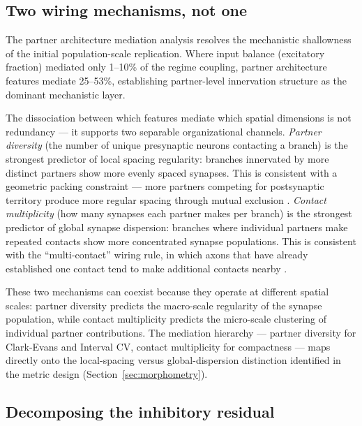 \documentclass[11pt]{article}
\begin{document}
\subsection{Two wiring mechanisms, not one}

The partner architecture mediation analysis resolves the mechanistic shallowness of the initial population-scale replication. Where input balance (excitatory fraction) mediated only 1--10\% of the regime coupling, partner architecture features mediate 25--53\%, establishing partner-level innervation structure as the dominant mechanistic layer.

The dissociation between which features mediate which spatial dimensions is not redundancy --- it supports two separable organizational channels. \textit{Partner diversity} (the number of unique presynaptic neurons contacting a branch) is the strongest predictor of local spacing regularity: branches innervated by more distinct partners show more evenly spaced synapses. This is consistent with a geometric packing constraint --- more partners competing for postsynaptic territory produce more regular spacing through mutual exclusion \citep{kasthuri2015}. \textit{Contact multiplicity} (how many synapses each partner makes per branch) is the strongest predictor of global synapse dispersion: branches where individual partners make repeated contacts show more concentrated synapse populations. This is consistent with the ``multi-contact'' wiring rule, in which axons that have already established one contact tend to make additional contacts nearby \citep{druckmann2014}.

These two mechanisms can coexist because they operate at different spatial scales: partner diversity predicts the macro-scale regularity of the synapse population, while contact multiplicity predicts the micro-scale clustering of individual partner contributions. The mediation hierarchy --- partner diversity for Clark-Evans and Interval CV, contact multiplicity for compactness --- maps directly onto the local-spacing versus global-dispersion distinction identified in the metric design (Section~\ref{sec:morphometry}).


\subsection{Decomposing the inhibitory residual}
\label{sec:decompose_residual}
\end{document}
